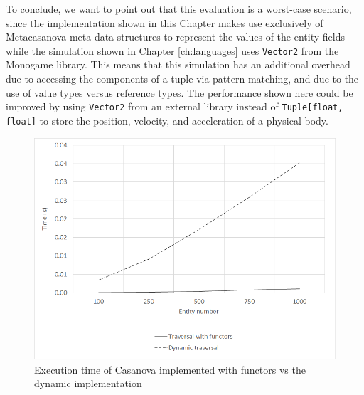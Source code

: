 To conclude, we want to point out that this evaluation is a worst-case scenario, since the implementation shown in this Chapter makes use exclusively of Metacasanova meta-data structures to represent the values of the entity fields while the simulation shown in Chapter \ref{ch:languages} uses \texttt{Vector2} from the Monogame library. This means that this simulation has an additional overhead due to accessing the components of a tuple via pattern matching, and due to the use of value types versus reference types. The performance shown here could be improved by using \texttt{Vector2} from an external library instead of \texttt{Tuple[float, float]} to store the position, velocity, and acceleration of a physical body.
\begin{table}
  \centering
 	\caption{Update time for one frame of the functor implementation of Casanova and the dynamic implementation shown in Chapter \ref{ch:languages}. The time is measured in seconds}
  \label{tab:ch_networking_evaluation}
\end{table}

\begin{figure}
  \centering
  \includegraphics[width=\textwidth]{Figures/chapter_networking/chart}
  \caption{Execution time of Casanova implemented with functors vs the dynamic implementation}
  \label{fig:ch_networking_chart}
\end{figure}

